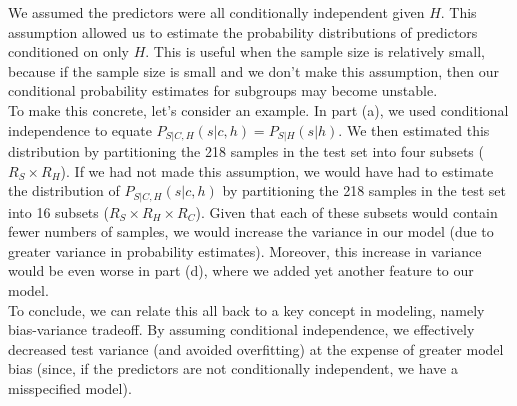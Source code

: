 \documentclass[paper=a4, fontsize=11pt]{scrartcl} %
\numberwithin{equation}{section} %
\numberwithin{figure}{section} %
\numberwithin{table}{section} %
\begin{document}
We assumed the predictors were all conditionally independent given $H$. This assumption allowed us to estimate the probability distributions of predictors conditioned on only $H$. This is useful when the sample size is relatively small, because if the sample size is small and we don't make this assumption, then our conditional probability estimates for subgroups may become unstable. \\

To make this concrete, let's consider an example. In part (a), we used conditional independence to equate $P_{S|C, H}(s | c, h) = P_{S|H}(s | h)$. We then estimated this distribution by partitioning the 218 samples in the test set into four subsets ($R_S \times R_H$). If we had not made this assumption, we would have had to estimate the distribution of $P_{S|C, H}(s | c, h)$ by partitioning the 218 samples in the test set into 16 subsets ($R_S \times R_H \times R_C$). Given that each of these subsets would contain fewer numbers of samples, we would increase the variance in our model (due to greater variance in probability estimates). Moreover, this increase in variance would be even worse in part (d), where we added yet another feature to our model.\\

To conclude, we can relate this all back to a key concept in modeling, namely bias-variance tradeoff. By assuming conditional independence, we effectively decreased test variance (and avoided overfitting) at the expense of greater model bias (since, if the predictors are not conditionally independent, we have a misspecified model).
\end{document}
